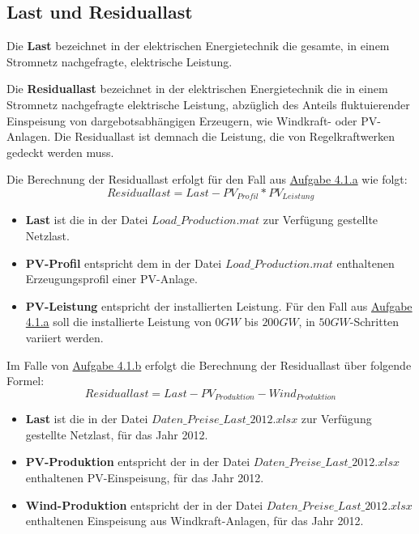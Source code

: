 \documentclass[a4paper,12pt]{article}
\begin{document}
	\subsection{Last und Residuallast}
	Die \textbf{Last} bezeichnet in der elektrischen Energietechnik die gesamte, in einem Stromnetz nachgefragte, elektrische Leistung. \\ \par
	\noindent Die \textbf{Residuallast} bezeichnet in der elektrischen Energietechnik die in einem Stromnetz nachgefragte elektrische Leistung, abzüglich des Anteils fluktuierender Einspeisung von dargebotsabhängigen Erzeugern, wie Windkraft- oder PV-Anlagen. Die Residuallast ist demnach die Leistung, die von Regelkraftwerken gedeckt werden muss.\\ \par
	\noindent Die Berechnung der Residuallast erfolgt für den Fall aus \hyperref[sec:Aufgabenstellung41]{Aufgabe 4.1.a} wie folgt:
	\begin{equation}
	Residuallast = Last - PV_{Profil} * PV_{Leistung}
	\end{equation}
	\begin{itemize}
		\item \textbf{Last} ist die in der Datei $Load\_Production.mat$ zur Verfügung gestellte Netzlast.
		\item \textbf{PV-Profil} entspricht dem in der Datei $Load\_Production.mat$ enthaltenen Erzeugungsprofil einer PV-Anlage.
		\item \textbf{PV-Leistung} entspricht der installierten Leistung. Für den Fall aus \hyperref[sec:Aufgabenstellung41]{Aufgabe 4.1.a} soll die installierte Leistung von $0GW$ bis $200GW$, in $50GW$-Schritten variiert werden.
	\end{itemize}
	Im Falle von \hyperref[sec:Aufgabenstellung41]{Aufgabe 4.1.b} erfolgt die Berechnung der Residuallast über folgende Formel:
	\begin{equation}
	Residuallast = Last - PV_{Produktion} - Wind_{Produktion}
	\end{equation}
	\begin{itemize}
		\item \textbf{Last} ist die in der Datei $Daten\_Preise\_Last\_2012.xlsx$ zur Verfügung gestellte Netzlast, für das Jahr 2012.
		\item \textbf{PV-Produktion} entspricht der in der Datei $Daten\_Preise\_Last\_2012.xlsx$ enthaltenen PV-Einspeisung, für das Jahr 2012.
		\item \textbf{Wind-Produktion} entspricht der in der Datei $Daten\_Preise\_Last\_2012.xlsx$ enthaltenen Einspeisung aus Windkraft-Anlagen, für das Jahr 2012.
	\end{itemize}
	\newpage
\end{document}
